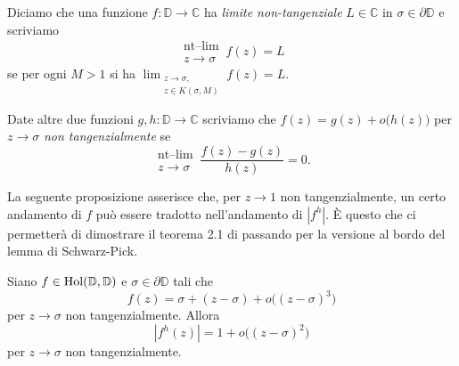 \begin{defn}
  Diciamo che una funzione $f:\mathbb{D} \longrightarrow \mathbb{C}$ ha \textit{limite non-tangenziale} $L \in \mathbb{C}$ in $\sigma \in \partial\mathbb{D}$ e scriviamo
  $$\substack{\text{nt--lim} \\ z \longrightarrow \sigma} \, f(z)=L$$
  se  per ogni $M>1$ si ha $\displaystyle \lim_{\substack{z \longrightarrow \sigma, \\ z \in K(\sigma,M)}} f(z)=L$.

  Date altre due funzioni $g,h: \mathbb{D} \longrightarrow \mathbb{C}$ scriviamo che $f(z)=g(z)+o\bigl(h(z)\bigr)$ per $z \longrightarrow \sigma$ \textit{non tangenzialmente} se
  $$\substack{\text{nt--lim} \\ z \longrightarrow \sigma} \, \frac{f(z)-g(z)}{h(z)}=0.$$
\end{defn}

La seguente proposizione asserisce che, per $z \longrightarrow 1$ non tangenzialmente, un certo andamento di $f$ può essere tradotto nell'andamento di $|f^h|$. È questo che ci permetterà di dimostrare il teorema 2.1 di \cite{BK} passando per la versione al bordo del lemma di Schwarz-Pick.

\begin{prop} \label{o^3->o^2}
  Siano $f \in \text{\normalfont{Hol}}(\mathbb{D},\mathbb{D})$ e $\sigma \in \partial\mathbb{D}$ tali che
  \begin{equation} \label{o^3}
    f(z)=\sigma+(z-\sigma)+o\bigl((z-\sigma)^3\bigr)
  \end{equation}
  per $z \longrightarrow \sigma$ non tangenzialmente. Allora
  \begin{equation} \label{o^2}
    |f^h(z)|=1+o\bigl((z-\sigma)^2\bigr)
  \end{equation}
  per $z \longrightarrow \sigma$ non tangenzialmente.
\end{prop}

